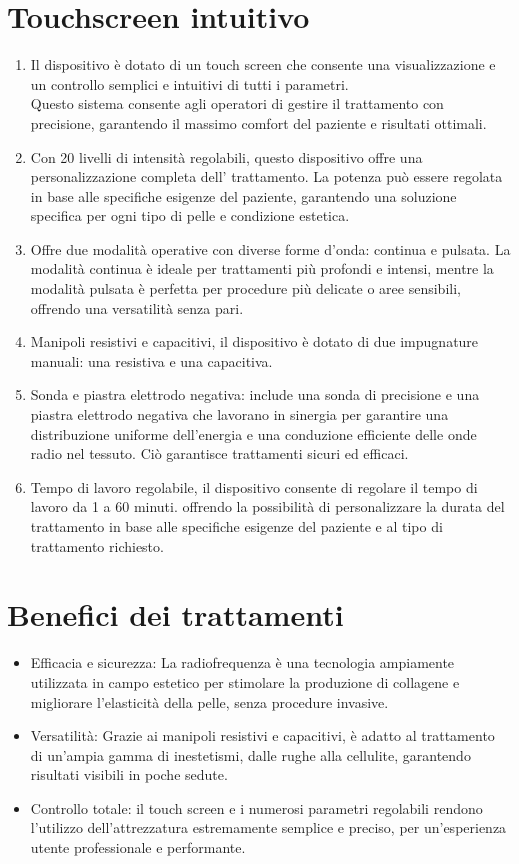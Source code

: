 \documentclass[a4paper]{article}
\begin{document}
\section{Touchscreen intuitivo}
\begin{enumerate}
	\item Il dispositivo è dotato di un touch screen che consente una visualizzazione e un controllo semplici e intuitivi di tutti i parametri.
	\\
	Questo sistema consente agli operatori di gestire il trattamento con precisione, garantendo il massimo comfort del paziente e risultati ottimali.
	\item Con 20 livelli di intensità regolabili, questo dispositivo offre una personalizzazione completa dell' trattamento. La potenza può essere regolata in base alle specifiche esigenze del paziente, garantendo una soluzione specifica per ogni tipo di pelle e condizione estetica.
	\item Offre due modalità operative con diverse forme d'onda: continua e pulsata. La modalità continua è ideale per trattamenti più profondi e intensi, mentre la modalità pulsata è perfetta per procedure più delicate o aree sensibili, offrendo una versatilità senza pari.
	\item Manipoli resistivi e capacitivi, il dispositivo è dotato di due impugnature manuali: una resistiva e una capacitiva.
	\item Sonda e piastra elettrodo negativa: include una sonda di precisione e una piastra elettrodo negativa che lavorano in sinergia per garantire una distribuzione uniforme dell'energia e una conduzione efficiente delle onde radio nel tessuto. Ciò garantisce trattamenti sicuri ed efficaci.
	\item Tempo di lavoro regolabile, il dispositivo consente di regolare il tempo di lavoro da 1 a 60 minuti. offrendo la possibilità di personalizzare la durata del trattamento in base alle specifiche esigenze del paziente e al tipo di trattamento richiesto.
\end{enumerate}

\section{Benefici dei trattamenti}
\begin{itemize}
  \item Efficacia e sicurezza: La radiofrequenza è una tecnologia ampiamente utilizzata in campo estetico per stimolare la produzione di collagene e migliorare l'elasticità della pelle, senza procedure invasive.
  \item Versatilità: Grazie ai manipoli resistivi e capacitivi, è adatto al trattamento di un'ampia gamma di inestetismi, dalle rughe alla cellulite, garantendo risultati visibili in poche sedute.
  \item Controllo totale: il touch screen e i numerosi parametri regolabili rendono l'utilizzo dell'attrezzatura estremamente semplice e preciso, per un'esperienza utente professionale e performante.
\end{itemize}
\end{document}
